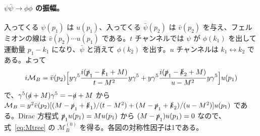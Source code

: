 \documentclass[a4paper,10pt]{ltjsarticle}
\begin{document}
\paragraph{$\psi\bar\psi\to\phi\phi$ の振幅。}入ってくる $\psi(p_1)$ は $u(p_1)$、入ってくる $\bar\psi(p_2)$ は $\bar v(p_2)$ を与え、フェルミオンの線は $\bar v(p_2)\cdots u(p_1)$ である。$t$ チャンネルでは $\psi$ が $\phi(k_1)$ を出して運動量 $p_1-k_1$ になり、$\bar\psi$ と消えて $\phi(k_2)$ を出す。$u$ チャンネルは $k_1\leftrightarrow k_2$ である。よって
\begin{equation*}
i\mathcal M_B=\bar v(p_2)\Bigl[y\gamma^5\frac{i(\slashed p_1-\slashed k_1+M)}{t-M^2}y\gamma^5+y\gamma^5\frac{i(\slashed p_1-\slashed k_2+M)}{u-M^2}y\gamma^5\Bigr]u(p_1)
\end{equation*}
で、$\gamma^5(\slashed a+M)\gamma^5=-\slashed a+M$ から $\mathcal M_B=y^2\bar v(p_2)[(M-\slashed p_1+\slashed k_1)/(t-M^2)+(M-\slashed p_1+\slashed k_2)/(u-M^2)]u(p_1)$ である。Dirac 方程式 $\slashed p_1u(p_1)=Mu(p_1)$ から $(M-\slashed p_1)u(p_1)=0$ なので、式~\eqref{eq:Mtree} の $\mathcal M_B^{(0)}$ を得る。各図の対称性因子は1である。
\end{document}
